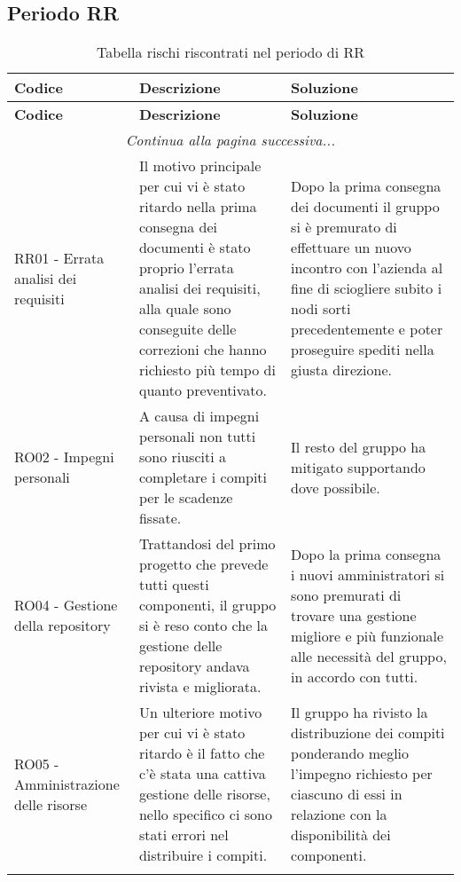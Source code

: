 \documentclass[../piano_di_progetto.tex]{subfiles}
\begin{document}
\subsection{Periodo RR}
\label{sub:rischi_rr}
\begin{center}
	\begin{longtable}{|p{4cm}|p{6cm}|p{6cm}|}
		\hline
		\rowcolor{lightgray}
		{\textbf{Codice}} & {\textbf{Descrizione}} & {\textbf{Soluzione}} \\
		\hline
		\endfirsthead
	
		\hline
		\rowcolor{lightgray}
		{\textbf{Codice}} & {\textbf{Descrizione}} & {\textbf{Soluzione}} \\
		\hline
		\endhead
		
		\hline
		\multicolumn{3}{|c|}{\emph{Continua alla pagina successiva...}}\\
		\hline
		\endfoot

		\endlastfoot
        RR01 - Errata analisi dei requisiti 
        & Il motivo principale per cui vi è stato ritardo nella prima consegna dei documenti è stato proprio l'errata analisi dei requisiti, alla quale sono conseguite delle correzioni che hanno richiesto più tempo di quanto preventivato.  
        & Dopo la prima consegna dei documenti il gruppo si è premurato di effettuare un nuovo incontro con l'azienda al fine di sciogliere subito i nodi sorti precedentemente e poter proseguire spediti nella giusta direzione. \\
        
        RO02 - Impegni personali
        & A causa di impegni personali non tutti sono riusciti a completare i compiti per le scadenze fissate.
        & Il resto del gruppo ha mitigato supportando dove possibile. \\
        
        RO04 - Gestione della repository
        & Trattandosi del primo progetto che prevede tutti questi componenti, il gruppo si è reso conto che la gestione delle repository andava rivista e migliorata.
        & Dopo la prima consegna i nuovi amministratori si sono premurati di trovare una gestione migliore e più funzionale alle necessità del gruppo, in accordo con tutti. \\

        RO05 - Amministrazione delle risorse
        & Un ulteriore motivo per cui vi è stato ritardo è il fatto che c’è stata una cattiva gestione delle risorse, nello specifico ci sono stati errori nel distribuire i compiti.
        & Il gruppo ha rivisto la distribuzione dei compiti ponderando meglio l'impegno richiesto per ciascuno di essi in relazione con la disponibilità dei componenti. \\
        
        \hline
		\rowcolor{white}
		\caption{Tabella rischi riscontrati nel periodo di RR}
	\end{longtable}

\end{center}
\end{document}
